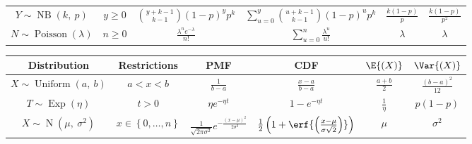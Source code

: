 \documentclass{article}
\begin{document}
\begin{table}[H]
\begin{tabular}{c c c c c c}
        \( Y \sim \operatorname{NB}{\left( k,\: p \right)}\)       & \(y \geq 0\)                                           & \(\binom{y + k - 1}{k - 1} \left( 1 - p \right)^y p^k\)   & \(\sum_{u = 0}^y \binom{u + k - 1}{k - 1} \left( 1 - p \right)^u p^k\)   & \(\frac{k\left( 1 - p \right)}{p}\) & \(\frac{k\left( 1 - p \right)}{p^2}\)         \\
        \( N \sim \operatorname{Poisson}{\left( \lambda \right)}\) & \(n \geq 0\)                                           & \(\frac{\lambda^n e^{-\lambda}}{n!}\)                     & \(\sum_{u = 0}^n \frac{\lambda^u}{u!}\)                                  & \(\lambda\)                         & \(\lambda\)                                   \\
        \bottomrule
    \end{tabular}
\end{table}
\begin{table}[H]
    \centering
    \begin{tabular}{c c c c c c}
        \toprule
        \textbf{Distribution}                                       & \textbf{Restrictions}                                  & \textbf{PMF}                                      & \textbf{CDF}                                                     & \(\E{\left( X \right)}\) & \(\Var{\left( X \right)}\)            \\
        \midrule
        \(X \sim \operatorname{Uniform}{\left( a,\: b \right)}\)    & \(a < x < b\)                                          & \(\frac{1}{b - a}\)                               & \(\frac{x - a}{b - a}\)                                          & \(\frac{a + b}{2}\)      & \(\frac{\left( b - a \right)^2}{12}\) \\
        \(T \sim \operatorname{Exp}{\left( \eta \right)}\)          & \(t > 0\) & \(\eta e^{-\eta t}\)              & \(1 - e^{-\eta t}\)                                                        & \(\frac{1}{\eta}\)                    & \(p \left( 1 - p \right)\)            \\
        \(X \sim \operatorname{N}{\left( \mu,\: \sigma^2 \right)}\) & \(x \in \left\{ 0, \dots, n \right\}\)                 & \(\frac{1}{\sqrt{2 \pi \sigma^2}} e^{-\frac{\left( x - \mu \right)^2}{2 \sigma^2}}\) & \(\frac{1}{2} \left( 1 + \erf{\left( \frac{x - \mu}{\sigma \sqrt{2}} \right)} \right)\) & \(\mu\)                  & \(\sigma^2\)                          \\
        \bottomrule
    \end{tabular}
\end{table}
\end{document}
